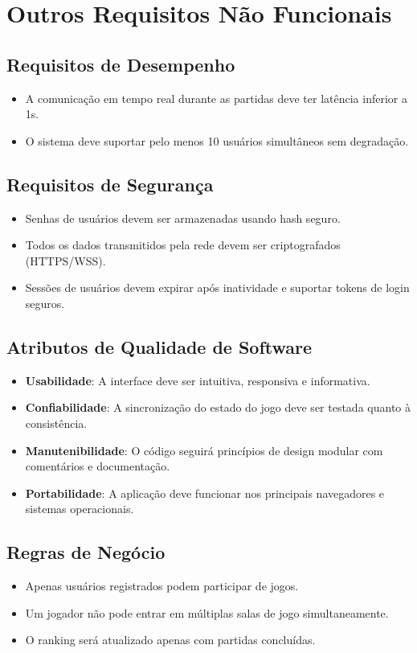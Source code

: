 \documentclass{scrreprt}
\begin{document}
\chapter{Outros Requisitos Não Funcionais}

\section{Requisitos de Desempenho}
\begin{itemize}
    \item A comunicação em tempo real durante as partidas deve ter latência inferior a 1s.
    \item O sistema deve suportar pelo menos 10 usuários simultâneos sem degradação.
\end{itemize}

\section{Requisitos de Segurança}
\begin{itemize}
    \item Senhas de usuários devem ser armazenadas usando hash seguro.
    \item Todos os dados transmitidos pela rede devem ser criptografados (HTTPS/WSS).
    \item Sessões de usuários devem expirar após inatividade e suportar tokens de login seguros.
\end{itemize}

\section{Atributos de Qualidade de Software}
\begin{itemize}
    \item \textbf{Usabilidade}: A interface deve ser intuitiva, responsiva e informativa.
    \item \textbf{Confiabilidade}: A sincronização do estado do jogo deve ser testada quanto à consistência.
    \item \textbf{Manutenibilidade}: O código seguirá princípios de design modular com comentários e documentação.
    \item \textbf{Portabilidade}: A aplicação deve funcionar nos principais navegadores e sistemas operacionais.
\end{itemize}

\section{Regras de Negócio}
\begin{itemize}
    \item Apenas usuários registrados podem participar de jogos.
    \item Um jogador não pode entrar em múltiplas salas de jogo simultaneamente.
    \item O ranking será atualizado apenas com partidas concluídas.
\end{itemize}
\end{document}
